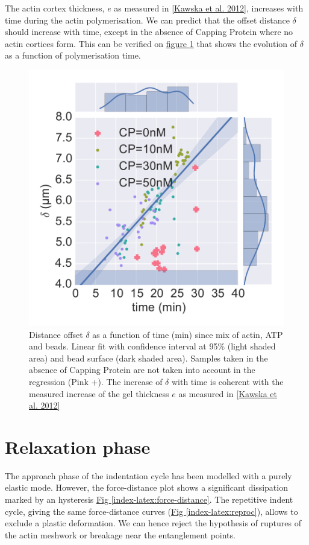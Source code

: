 \documentclass[A4paperpaper,11pt,english]{sphinxmanual}
\begin{document}
The actin cortex thickness, \(e\) as measured in {\hyperref[index-latex:kawska2012]{{[}Kawska et al. 2012{]}}},
increases with time during the actin polymerisation. We can predict that the
offset distance \(\delta\) should increase with time, except in the absence of
Capping Protein where no actin cortices form. This can be verified on
\hyperref[index-latex:time-delta-corr]{figure  \ref*{index-latex:time-delta-corr}} that shows the evolution of \(\delta\) as a function
of polymerisation time.
\begin{figure}[htbp]
\centering
\capstart

\includegraphics[width=0.900\linewidth]{time-delta-corr.pdf}
\caption{Distance offset \(\delta\) as a function of time (min) since mix of actin, ATP
and beads. Linear fit with confidence interval at 95\% (light shaded area)
and bead surface (dark shaded area). Samples taken in the absence of Capping
Protein are not taken into account in the regression (Pink +). The increase
of \(\delta\) with time is coherent with the measured increase of the gel
thickness \(e\) as measured in {\hyperref[index-latex:kawska2012]{{[}Kawska et al. 2012{]}}}}\label{index-latex:time-delta-corr}\end{figure}


\section{Relaxation phase}
\label{index-latex:id29}
The approach phase of the indentation cycle has been modelled with a purely
elastic mode. However, the force-distance plot shows a significant dissipation
marked by an hysteresis \hyperref[index-latex:force-distance]{Fig  \ref*{index-latex:force-distance}}. The repetitive indent cycle, giving the same
force-distance curves (\hyperref[index-latex:reproc]{Fig  \ref*{index-latex:reproc}}), allows to exclude a plastic deformation.
We can hence reject the hypothesis of ruptures of the
actin meshwork or breakage near the entanglement points.
\end{document}
